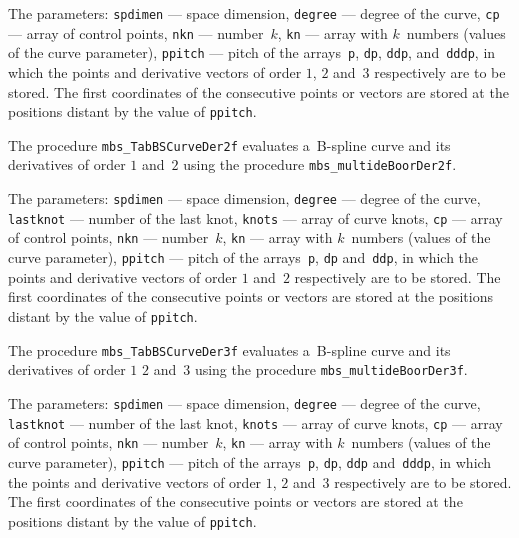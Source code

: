 The parameters: \texttt{spdimen} --- space dimension,
\texttt{degree} --- degree of the curve, \texttt{cp} --- array of control points,
\texttt{nkn} --- number~$k$, \texttt{kn} --- array with
$k$~numbers (values of the curve parameter), \texttt{ppitch} --- pitch
of the arrays~\texttt{p}, \texttt{dp}, \texttt{ddp}, and~\texttt{dddp}, in which the
points and derivative vectors of order $1$, $2$ and~$3$ respectively are to be stored.
The first coordinates of the consecutive points or vectors are stored
at the positions distant by the value of \texttt{ppitch}.

\vspace{\bigskipamount}
The procedure \texttt{mbs\_TabBSCurveDer2f} evaluates a~B-spline curve
and its derivatives of order $1$ and~$2$ using the procedure
\texttt{mbs\_multideBoorDer2f}.

The parameters: \texttt{spdimen} --- space dimension,
\texttt{degree} --- degree of the curve, \texttt{lastknot} --- number
of the last knot, \texttt{knots} --- array of curve knots, 
\texttt{cp} --- array of control points,
\texttt{nkn} --- number~$k$, \texttt{kn} --- array with
$k$~numbers (values of the curve parameter), \texttt{ppitch} --- pitch
of the arrays~\texttt{p}, \texttt{dp} and~\texttt{ddp}, in which the
points and derivative vectors of order $1$ and~$2$ respectively are to be stored.
The first coordinates of the consecutive points or vectors are stored
at the positions distant by the value of \texttt{ppitch}.


\vspace{\bigskipamount}
The procedure \texttt{mbs\_TabBSCurveDer3f} evaluates a~B-spline curve
and its derivatives of order $1$ $2$ and~$3$ using the procedure
\texttt{mbs\_multideBoorDer3f}.

The parameters: \texttt{spdimen} --- space dimension,
\texttt{degree} --- degree of the curve, \texttt{lastknot} --- number
of the last knot, \texttt{knots} --- array of curve knots, 
\texttt{cp} --- array of control points,
\texttt{nkn} --- number~$k$, \texttt{kn} --- array with
$k$~numbers (values of the curve parameter), \texttt{ppitch} --- pitch
of the arrays~\texttt{p}, \texttt{dp}, \texttt{ddp} and~\texttt{dddp}, in which the
points and derivative vectors of order $1$, $2$ and~$3$ respectively are to be stored.
The first coordinates of the consecutive points or vectors are stored
at the positions distant by the value of \texttt{ppitch}.


